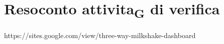 
\section{Resoconto attivita\textsubscript{G} di verifica}
https://sites.google.com/view/three-way-milkshake-dashboard
